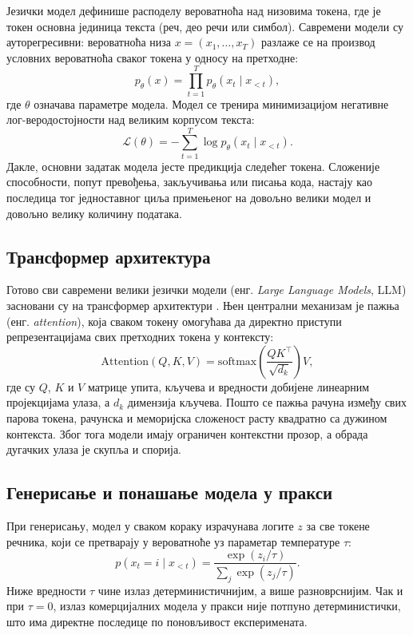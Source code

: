 \documentclass[12pt,a4paper]{report}
\begin{document}
	Језички модел дефинише расподелу вероватноћа над низовима токена, где је
	токен основна јединица текста (реч, део речи или симбол). Савремени модели
	су ауторегресивни: вероватноћа низа $x = (x_1, \dots, x_T)$ разлаже се на
	производ условних вероватноћа сваког токена у односу на претходне:
	\begin{equation}
		p_\theta(x) = \prod_{t=1}^{T} p_\theta(x_t \mid x_{<t}),
		\label{eq:autoregresija}
	\end{equation}
	где $\theta$ означава параметре модела. Модел се тренира минимизацијом
	негативне лог-веродостојности над великим корпусом текста:
	\begin{equation}
		\mathcal{L}(\theta) = -\sum_{t=1}^{T} \log p_\theta(x_t \mid x_{<t}).
	\end{equation}
	Дакле, основни задатак модела јесте предикција следећег токена. Сложеније
	способности, попут превођења, закључивања или писања кода, настају као
	последица тог једноставног циља примењеног на довољно велики модел и
	довољно велику количину података.

	\subsection{Трансформер архитектура}

	Готово сви савремени велики језички модели (енг. \textit{Large Language
	Models}, LLM) засновани су на трансформер архитектури
	\parencite{vaswani2017attention}. Њен централни механизам је пажња (енг.
	\textit{attention}), која сваком токену омогућава да директно приступи
	репрезентацијама свих претходних токена у контексту:
	\begin{equation}
		\mathrm{Attention}(Q, K, V) = \mathrm{softmax}\!\left(\frac{QK^\top}{\sqrt{d_k}}\right) V,
	\end{equation}
	где су $Q$, $K$ и $V$ матрице упита, кључева и вредности добијене линеарним
	пројекцијама улаза, а $d_k$ димензија кључева. Пошто се пажња рачуна између
	свих парова токена, рачунска и меморијска сложеност расту квадратно са
	дужином контекста. Због тога модели имају ограничен контекстни прозор, а
	обрада дугачких улаза је скупља и спорија.

	\subsection{Генерисање и понашање модела у пракси}

	При генерисању, модел у сваком кораку израчунава логите $z$ за све токене
	речника, који се претварају у вероватноће уз параметар температуре $\tau$:
	\begin{equation}
		p(x_t = i \mid x_{<t}) = \frac{\exp(z_i / \tau)}{\sum_j \exp(z_j / \tau)}.
	\end{equation}
	Ниже вредности $\tau$ чине излаз детерминистичнијим, а више разноврснијим.
	Чак и при $\tau = 0$, излаз комерцијалних модела у пракси није потпуно
	детерминистички, што има директне последице по поновљивост експеримената.
\end{document}
